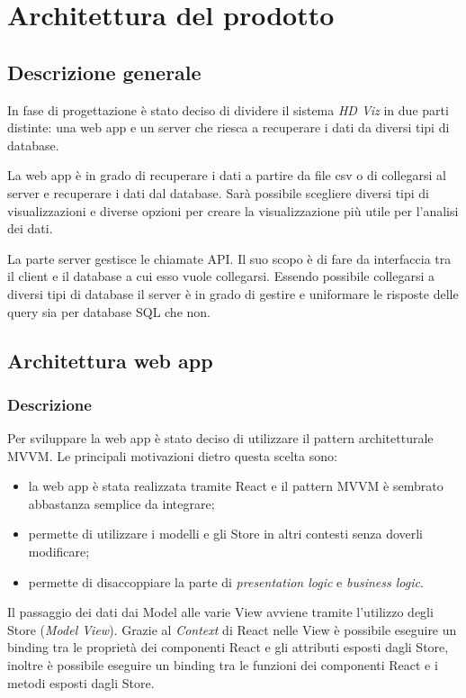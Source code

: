\section{Architettura del prodotto}

\subsection{Descrizione generale}
In fase di progettazione è stato deciso di dividere il sistema \emph{HD Viz} in due parti distinte: una web app e un server che riesca a recuperare i dati da diversi tipi di database.

La web app è in grado di recuperare i dati a partire da file csv o di collegarsi al server e recuperare i dati dal database. Sarà possibile scegliere diversi tipi di visualizzazioni e diverse opzioni per creare la visualizzazione più utile per l'analisi dei dati.

La parte server gestisce le chiamate API. Il suo scopo è di fare da interfaccia tra il client e il database a cui esso vuole collegarsi. Essendo possibile collegarsi a diversi tipi di database il server è in grado di gestire e uniformare le risposte delle query sia per database SQL che non.

\subsection{Architettura web app}
    \subsubsection{Descrizione}
    Per sviluppare la web app è stato deciso di utilizzare il pattern architetturale MVVM. Le principali motivazioni dietro questa scelta sono: 
    \begin{itemize}
        \item la web app è stata realizzata tramite React e il pattern MVVM è sembrato abbastanza semplice da integrare;
        \item permette di utilizzare i modelli e gli Store in altri contesti senza doverli modificare;
        \item permette di disaccoppiare la parte di \emph{presentation logic} e \emph{business logic}.
    \end{itemize}
    
    Il passaggio dei dati dai Model alle varie View avviene tramite l'utilizzo degli Store (\emph{Model View}). Grazie al \emph{Context} di React nelle View è possibile eseguire un binding tra le proprietà dei componenti React e gli attributi esposti dagli Store, inoltre è possibile eseguire un binding tra le funzioni dei componenti React e i metodi esposti dagli Store.
    
